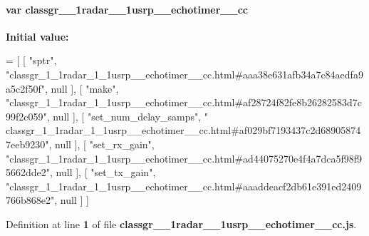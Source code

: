 \paragraph[{classgr\+\_\+1\+\_\+1radar\+\_\+1\+\_\+1usrp\+\_\+\+\_\+echotimer\+\_\+\+\_\+cc}]{\setlength{\rightskip}{0pt plus 5cm}var classgr\+\_\+\_\+1radar\+\_\+\_\+1usrp\+\_\+\+\_\+echotimer\+\_\+\+\_\+cc}\label{classgr__1__1radar__1__1usrp____echotimer____cc_8js_a97d4cbf2daa7fd11addddaea8addb44a}
{\bfseries Initial value\+:}
\begin{DoxyCode}
=
[
    [ \textcolor{stringliteral}{"sptr"}, \textcolor{stringliteral}{"classgr\_1\_1radar\_1\_1usrp\_\_echotimer\_\_cc.html#aaa38e631afb34a7c84aedfa9a5c2f50f"}, null ],
    [ \textcolor{stringliteral}{"make"}, \textcolor{stringliteral}{"classgr\_1\_1radar\_1\_1usrp\_\_echotimer\_\_cc.html#af28724f82fe8b26282583d7c99f2c059"}, null ],
    [ \textcolor{stringliteral}{"set\_num\_delay\_samps"}, \textcolor{stringliteral}{"
      classgr\_1\_1radar\_1\_1usrp\_\_echotimer\_\_cc.html#af029bf7193437c2d689058747eeb9230"}, null ],
    [ \textcolor{stringliteral}{"set\_rx\_gain"}, \textcolor{stringliteral}{"classgr\_1\_1radar\_1\_1usrp\_\_echotimer\_\_cc.html#ad44075270e4f4a7dca5f98f95662dde2"}, null
       ],
    [ \textcolor{stringliteral}{"set\_tx\_gain"}, \textcolor{stringliteral}{"classgr\_1\_1radar\_1\_1usrp\_\_echotimer\_\_cc.html#aaaddeacf2db61e391ed2409766b868e2"}, null
       ]
]
\end{DoxyCode}


Definition at line {\bf 1} of file {\bf classgr\+\_\+\_\+1radar\+\_\+\_\+1usrp\+\_\+\+\_\+echotimer\+\_\+\+\_\+cc.\+js}.

